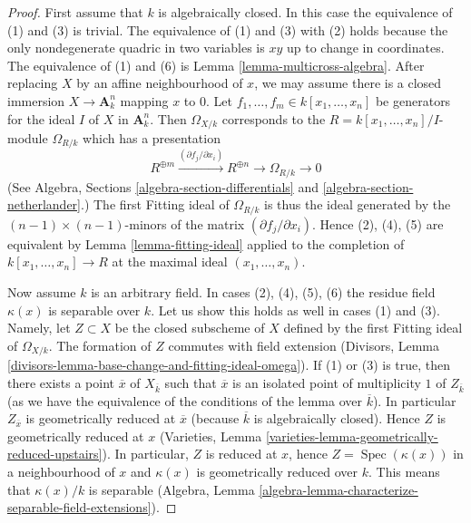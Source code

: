 \documentclass{stacks-project}
\theoremstyle{plain}
\theoremstyle{definition}
\theoremstyle{remark}
\numberwithin{equation}{subsection}
\def\Spec{\mathop{\mathrm{Spec}}}
\begin{document}
\begin{proof}
First assume that $k$ is algebraically closed.
In this case the equivalence of (1) and (3) is trivial.
The equivalence of (1) and (3) with (2) holds because the only
nondegenerate quadric in two variables is $xy$ up to change in
coordinates. The equivalence of (1) and (6) is 
Lemma \ref{lemma-multicross-algebra}.
After replacing $X$ by an affine neighbourhood
of $x$, we may assume there is a closed immersion $X \to \mathbf{A}^n_k$
mapping $x$ to $0$. Let $f_1, \ldots, f_m \in k[x_1, \ldots, x_n]$
be generators for the ideal $I$ of $X$ in $\mathbf{A}^n_k$.
Then $\Omega_{X/k}$ corresponds to the $R = k[x_1, \ldots, x_n]/I$-module
$\Omega_{R/k}$ which has a presentation
$$
R^{\oplus m} \xrightarrow{(\partial f_j/\partial x_i)}
R^{\oplus n} \to \Omega_{R/k} \to 0
$$
(See Algebra, Sections \ref{algebra-section-differentials} and
\ref{algebra-section-netherlander}.)
The first Fitting ideal of $\Omega_{R/k}$ is thus the ideal
generated by the $(n - 1) \times (n - 1)$-minors of the
matrix $(\partial f_j/\partial x_i)$. Hence (2), (4), (5)
are equivalent by Lemma \ref{lemma-fitting-ideal} applied
to the completion of $k[x_1, \ldots, x_n] \to R$
at the maximal ideal $(x_1, \ldots, x_n)$.

\medskip\noindent
Now assume $k$ is an arbitrary field.
In cases (2), (4), (5), (6) the residue field $\kappa(x)$ is
separable over $k$. Let us show this holds as well
in cases (1) and (3). Namely, let $Z \subset X$ be the closed subscheme
of $X$ defined by the first Fitting ideal of $\Omega_{X/k}$.
The formation of $Z$ commutes with field extension
(Divisors, Lemma \ref{divisors-lemma-base-change-and-fitting-ideal-omega}).
If (1) or (3) is true, then there exists a point
$\overline{x}$ of $X_{\overline{k}}$ such that $\overline{x}$
is an isolated point of multiplicity $1$ of $Z_{\overline{k}}$ (as we have the
equivalence of the conditions of the lemma over $\overline{k}$).
In particular $Z_{\overline{x}}$ is geometrically reduced at $\overline{x}$
(because $\overline{k}$ is algebraically closed). Hence
$Z$ is geometrically reduced at $x$
(Varieties, Lemma \ref{varieties-lemma-geometrically-reduced-upstairs}).
In particular, $Z$ is reduced at $x$, hence $Z = \Spec(\kappa(x))$
in a neighbourhood of $x$ and $\kappa(x)$ is geometrically reduced
over $k$. This means that $\kappa(x)/k$ is separable
(Algebra, Lemma \ref{algebra-lemma-characterize-separable-field-extensions}).


\end{proof}
\end{document}

